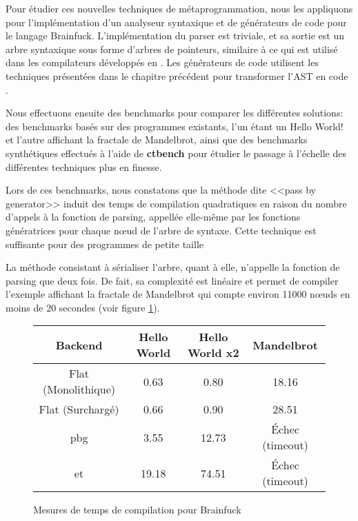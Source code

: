 \documentclass[main]{subfiles}
\begin{document}
Pour \'etudier ces nouvelles techniques de m\'etaprogrammation,
nous les appliquons pour l'impl\'ementation d'un analyseur syntaxique et
de g\'en\'erateurs de code pour le langage Brainfuck.
L'impl\'ementation du parser est triviale, et sa sortie est un arbre syntaxique
sous forme d'arbres de pointeurs, similaire \`a ce qui est utilis\'e dans les
compilateurs d\'evelopp\'es en \cpp.
Les g\'en\'erateurs de code utilisent les techniques pr\'esent\'ees
dans le chapitre pr\'ec\'edent pour transformer l'AST en code \cpp.

Nous effectuons ensuite des benchmarks pour comparer
les diff\'erentes solutions: des benchmarks bas\'es sur
des programmes existants, l'un \'etant un Hello World! et l'autre affichant
la fractale de Mandelbrot, ainsi que des benchmarks synth\'etiques effectu\'es
\`a l'aide de \textbf{ctbench} pour \'etudier le passage \`a l'\'echelle
des diff\'erentes techniques plus en finesse.

Lors de ces benchmarks, nous constatons que la m\'ethode dite
<<pass by generator>> induit des temps de compilation quadratiques en raison
du nombre d'appels \`a la fonction de parsing, appell\'ee elle-m\^eme par les
fonctions g\'en\'eratrices pour chaque n\oe{}ud de l'arbre de syntaxe.
Cette technique est suffisante pour des programmes de petite taille

La m\'ethode consistant \`a s\'erialiser l'arbre, quant \`a elle, n'appelle
la fonction de parsing que deux fois. De fait, sa complexit\'e est lin\'eaire
et permet de compiler l'exemple affichant la fractale de Mandelbrot qui compte
environ 11000 n\oe{}uds en moins de 20 secondes (voir figure
\ref{fig:bf-compile-times-fr}).

\begin{figure}[h]
\begin{tabular}{|c|c|c|c|}
\hline
Backend           & Hello World & Hello World x2  & Mandelbrot \\
\hline
Flat (Monolithique) & 0.63        & 0.80            & 18.16 \\
Flat (Surcharg\'e)  & 0.66        & 0.90            & 28.51 \\
\gls{pbg}           & 3.55        & 12.73           & \'Echec (timeout) \\
\gls{et}            & 19.18       & 74.51           & \'Echec (timeout) \\
\hline
\end{tabular}
\caption{Mesures de temps de compilation pour Brainfuck}
\label{fig:bf-compile-times-fr}
\end{figure}
\end{document}
